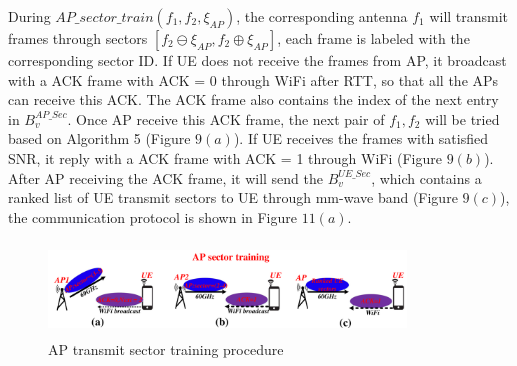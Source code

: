 \documentclass[conference]{IEEEtran}
\begin{document}
During $AP\_sector\_train(f_{1},f_{2},\xi_{AP})$, the corresponding antenna $f_{1}$ will transmit frames through sectors $[f_{2}\ominus \xi_{AP},f_{2}\oplus \xi_{AP}]$, each frame is labeled with the corresponding sector ID. If UE does not receive the frames from AP, it broadcast with a ACK frame with ACK = 0 through WiFi after RTT, so that all the APs can receive this ACK. The ACK frame also contains the index of the next entry in $B_{v}^{AP\_Sec}$. Once AP receive this ACK frame, the next pair of $f_{1},f_{2}$ will be tried based on Algorithm 5 (Figure $9(a)$). If UE receives the frames with satisfied SNR, it reply with a ACK frame with ACK = 1 through WiFi (Figure $9(b)$). After AP receiving the ACK frame, it will send the $B^{UE\_Sec}_{v}$, which contains a ranked list of UE transmit sectors to UE through mm-wave band (Figure $9(c)$), the communication protocol is shown in Figure $11(a)$.
\begin{figure}
	\centerline{\includegraphics[width=9.5cm,height=2.5cm]{ap_sector_training}}
	\caption[U-example]{AP transmit sector training procedure}
\end{figure}
\end{document}

